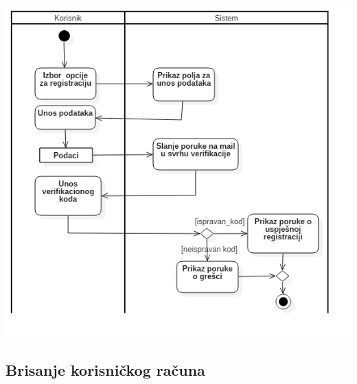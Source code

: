 \begin{center}
    \includegraphics[scale=0.8]{images/RegistracijaKorisnika.png}
\end{center}

\subsection{Brisanje korisničkog računa}

